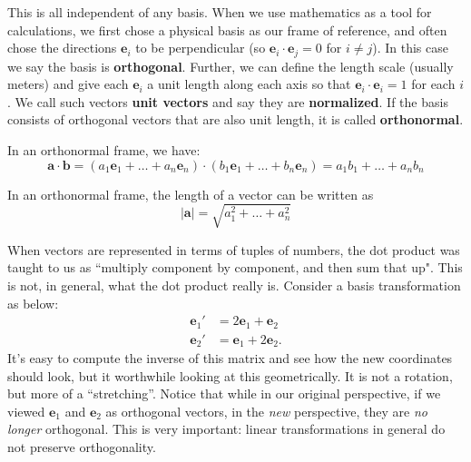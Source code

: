 \documentclass[../master.tex]{subfiles}
\begin{document}
	This is all independent of any basis. When we use mathematics as a tool for calculations, we first chose a physical basis as our frame of reference, and often chose the directions $\mathbf e_i$ to be perpendicular (so $\mathbf e_i \cdot \mathbf e_j = 0$ for $i \neq j$). In this case we say the basis is \textbf{orthogonal}. Further, we can define the length scale (usually meters) and give each $\mathbf e_i$ a unit length along each axis so that $\mathbf e_i \cdot \mathbf e_i = 1$ for each $i$. We call such vectors \textbf{unit vectors} and say they are \textbf{normalized}. If the basis consists of orthogonal vectors that are also unit length, it is called \textbf{orthonormal}. 
	\begin{obs}
		In an orthonormal frame, we have:
		\begin{equation}
			\mathbf a \cdot \mathbf b = (a_1 \mathbf e_1 + \dots + a_n \mathbf e_n) \cdot (b_1 \mathbf e_1 + \dots + b_n \mathbf e_n) = a_1 b_1 + \dots + a_n b_n
		\end{equation}
	\end{obs}
	
	\begin{cor}
		In an orthonormal frame, the length of a vector can be written as
		\begin{equation}
			|\mathbf a| = \sqrt{a_1^2 + \dots + a_n^2}
		\end{equation}
	\end{cor}
	
	When vectors are represented in terms of tuples of numbers, the dot product was taught to us as ``multiply component by component, and then sum that up". This is not, in general, what the dot product really is. Consider a basis transformation as below:
	\begin{align*}
		\mathbf e_1' &= 2 \mathbf e_1 + \mathbf e_2 \\
		\mathbf e_2' &=  \mathbf e_1 + 2 \mathbf e_2.
	\end{align*}
	It's easy to compute the inverse of this matrix and see how the new coordinates should look, but it worthwhile looking at this geometrically. It is not a rotation, but more of a ``stretching''. Notice that while in our original perspective, if we viewed $\mathbf e_1$ and $\mathbf e_2$ as orthogonal vectors, in the \emph{new} perspective, they are \emph{no longer} orthogonal. This is very important: linear transformations in general do not preserve orthogonality. \
	
\end{document}
